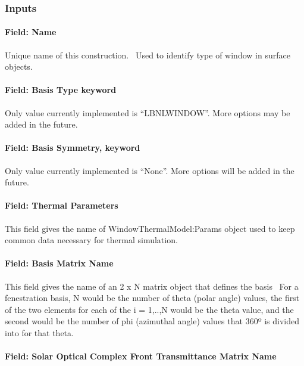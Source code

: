 \subsubsection{Inputs}\label{inputs-39}

\paragraph{Field: Name}\label{field-name-32-000}

Unique name of this construction.~ Used to identify type of window in surface objects.

\paragraph{Field: Basis Type keyword}\label{field-basis-type-keyword}

Only value currently implemented is ``LBNLWINDOW''. More options may be added in the future.

\paragraph{Field: Basis Symmetry, keyword}\label{field-basis-symmetry-keyword}

Only value currently implemented is ``None''. More options will be added in the future.

\paragraph{Field: Thermal Parameters}\label{field-thermal-parameters}

This field gives the name of WindowThermalModel:Params object used to keep common data necessary for thermal simulation.

\paragraph{Field: Basis Matrix Name}\label{field-basis-matrix-name}

This field gives the name of an 2 x N matrix object that defines the basis~ For a fenestration basis, N would be the number of theta (polar angle) values, the first of the two elements for each of the i = 1,..,N would be the theta value, and the second would be the number of phi (azimuthal angle) values that 360º is divided into for that theta.

\paragraph{Field: Solar Optical Complex Front Transmittance Matrix Name}\label{field-solar-optical-complex-front-transmittance-matrix-name}

